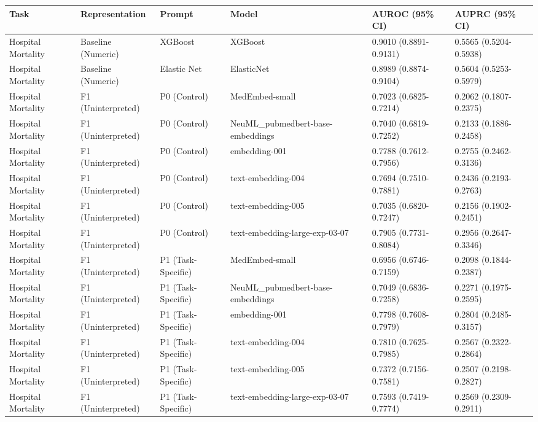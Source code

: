 \begin{tabular}{llllll}
\toprule
Task & Representation & Prompt & Model & AUROC (95\% CI) & AUPRC (95\% CI) \\
\midrule
Hospital Mortality & Baseline (Numeric) & XGBoost & XGBoost & 0.9010 (0.8891-0.9131) & 0.5565 (0.5204-0.5938) \\
Hospital Mortality & Baseline (Numeric) & Elastic Net & ElasticNet & 0.8989 (0.8874-0.9104) & 0.5604 (0.5253-0.5979) \\
Hospital Mortality & F1 (Uninterpreted) & P0 (Control) & MedEmbed-small & 0.7023 (0.6825-0.7214) & 0.2062 (0.1807-0.2375) \\
Hospital Mortality & F1 (Uninterpreted) & P0 (Control) & NeuML\_pubmedbert-base-embeddings & 0.7040 (0.6819-0.7252) & 0.2133 (0.1886-0.2458) \\
Hospital Mortality & F1 (Uninterpreted) & P0 (Control) & embedding-001 & 0.7788 (0.7612-0.7956) & 0.2755 (0.2462-0.3136) \\
Hospital Mortality & F1 (Uninterpreted) & P0 (Control) & text-embedding-004 & 0.7694 (0.7510-0.7881) & 0.2436 (0.2193-0.2763) \\
Hospital Mortality & F1 (Uninterpreted) & P0 (Control) & text-embedding-005 & 0.7035 (0.6820-0.7247) & 0.2156 (0.1902-0.2451) \\
Hospital Mortality & F1 (Uninterpreted) & P0 (Control) & text-embedding-large-exp-03-07 & 0.7905 (0.7731-0.8084) & 0.2956 (0.2647-0.3346) \\
Hospital Mortality & F1 (Uninterpreted) & P1 (Task-Specific) & MedEmbed-small & 0.6956 (0.6746-0.7159) & 0.2098 (0.1844-0.2387) \\
Hospital Mortality & F1 (Uninterpreted) & P1 (Task-Specific) & NeuML\_pubmedbert-base-embeddings & 0.7049 (0.6836-0.7258) & 0.2271 (0.1975-0.2595) \\
Hospital Mortality & F1 (Uninterpreted) & P1 (Task-Specific) & embedding-001 & 0.7798 (0.7608-0.7979) & 0.2804 (0.2485-0.3157) \\
Hospital Mortality & F1 (Uninterpreted) & P1 (Task-Specific) & text-embedding-004 & 0.7810 (0.7625-0.7985) & 0.2567 (0.2322-0.2864) \\
Hospital Mortality & F1 (Uninterpreted) & P1 (Task-Specific) & text-embedding-005 & 0.7372 (0.7156-0.7581) & 0.2507 (0.2198-0.2827) \\
Hospital Mortality & F1 (Uninterpreted) & P1 (Task-Specific) & text-embedding-large-exp-03-07 & 0.7593 (0.7419-0.7774) & 0.2569 (0.2309-0.2911) \\

\end{tabular}
